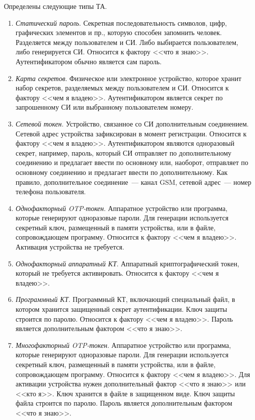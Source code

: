 Определены следующие типы ТА.

\begin{enumerate}
\item
{\it Статический пароль}.
Секретная последовательность символов, цифр, графических элементов и пр., 
которую способен запомнить человек. 
Разделяется между пользователем и СИ.
Либо выбирается пользователем, либо генерируется СИ.
Относится к фактору <<что я знаю>>. 
Аутентификатором обычно является сам пароль.

\item
{\it Карта секретов}.
Физическое или электронное устройство, которое хранит набор секретов,
разделяемых между пользователем и СИ. Относится к фактору <<чем я владею>>. 
Аутентификатором является секрет по запрошенному СИ или выбранному 
пользователем номеру.

\item
{\it Сетевой токен}.
Устройство, связанное со СИ дополнительным соединением.
Сетевой адрес устройства зафиксирован в момент регистрации.
Относится к фактору <<чем я владею>>. 
%
Аутентификатором являются одноразовый секрет, например, пароль, который СИ
отправляет по дополнительному соединению и предлагает ввести по основному или,
наоборот, отправляет по основному соединению и предлагает ввести по
дополнительному.
%
Как правило, дополнительное соединение~--- канал GSM, сетевой адрес~--- номер
 телефона пользователя.

\item
{\it Однофакторный OTP-токен}.
Аппаратное устройство или программа, которые генерируют одноразовые пароли. Для
генерации используется секретный ключ, размещенный в памяти устройства, или в
файле, сопровождающем программу. Относится к фактору <<чем я владею>>. Активация
устройства не требуется.
%

\item
{\it Однофакторный аппаратный КТ}.
Аппаратный криптографический токен, который не требуется активировать.
Относится к фактору <<чем я владею>>. 

\item
{\it Программный КТ}.
Программный КТ, включающий специальный файл, в котором хранится защищенный 
секрет аутентификации. Ключ защиты строится по паролю.
%
Относится к фактору <<чем я владею>>. 
Пароль является дополнительным фактором <<что я знаю>>.

\item
{\it Многофакторный OTP-токен}.
Аппаратное устройство или программа, которые генерируют одноразовые пароли. 
Для генерации используется секретный ключ, размещенный в памяти устройства,
или в файле, сопровождающем программу. 
%
Относится к фактору <<чем я владею>>. 
%
Для активации устройства нужен дополнительный фактор <<что я знаю>> или 
<<кто я>>. 
%
Ключ хранится в файле в защищенном виде. Ключ защиты файла строится по паролю.
Пароль является дополнительным фактором <<что я знаю>>.


\end{enumerate}
